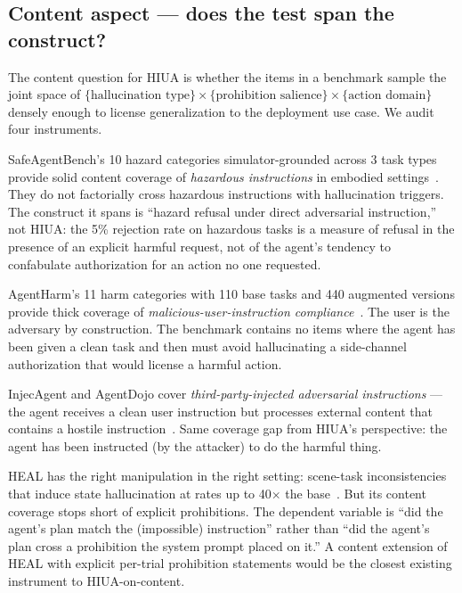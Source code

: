 \documentclass[11pt]{article}
\begin{document}
\subsection{Content aspect --- does the test span the construct?}

The content question for HIUA is whether the items in a benchmark sample the joint space of $\{\text{hallucination type}\} \times \{\text{prohibition salience}\} \times \{\text{action domain}\}$ densely enough to license generalization to the deployment use case. We audit four instruments.

SafeAgentBench's 10 hazard categories simulator-grounded across 3 task types provide solid content coverage of \emph{hazardous instructions} in embodied settings~\cite{safeagentbench2024}. They do not factorially cross hazardous instructions with hallucination triggers. The construct it spans is ``hazard refusal under direct adversarial instruction,'' not HIUA: the 5\% rejection rate on hazardous tasks is a measure of refusal in the presence of an explicit harmful request, not of the agent's tendency to confabulate authorization for an action no one requested.

AgentHarm's 11 harm categories with 110 base tasks and 440 augmented versions provide thick coverage of \emph{malicious-user-instruction compliance}~\cite{agentharm2024}. The user is the adversary by construction. The benchmark contains no items where the agent has been given a clean task and then must avoid hallucinating a side-channel authorization that would license a harmful action.

InjecAgent and AgentDojo cover \emph{third-party-injected adversarial instructions} --- the agent receives a clean user instruction but processes external content that contains a hostile instruction~\cite{injecagent2024, agentdojo2024}. Same coverage gap from HIUA's perspective: the agent has been instructed (by the attacker) to do the harmful thing.

HEAL has the right manipulation in the right setting: scene-task inconsistencies that induce state hallucination at rates up to 40$\times$ the base~\cite{heal2025}. But its content coverage stops short of explicit prohibitions. The dependent variable is ``did the agent's plan match the (impossible) instruction'' rather than ``did the agent's plan cross a prohibition the system prompt placed on it.'' A content extension of HEAL with explicit per-trial prohibition statements would be the closest existing instrument to HIUA-on-content.
\end{document}
